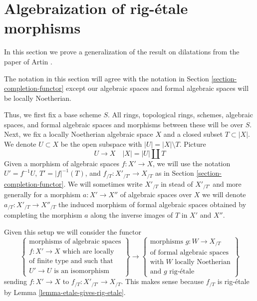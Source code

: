 













\section{Algebraization of rig-\'etale morphisms}
\label{section-algebraization}

\noindent
In this section we prove a generalization of the result on dilatations
from the paper of Artin \cite{ArtinII}.

\medskip\noindent
The notation in this section will agree with the notation in
Section \ref{section-completion-functor} except our algebraic
spaces and formal algebraic spaces will be locally Noetherian.

\medskip\noindent
Thus, we first fix a base scheme $S$. All rings, topological rings,
schemes, algebraic spaces, and formal algebraic spaces and
morphisms between these will be over $S$. Next, we fix a
locally Noetherian algebraic space $X$ and a closed subset $T \subset |X|$.
We denote $U \subset X$ be the open subspace with $|U| = |X| \setminus T$.
Picture
$$
U \to X \quad |X| = |U| \amalg T
$$
Given a morphism of algebraic spaces $f : X' \to X$, we will use the notation
$U' = f^{-1}U$, $T' = |f|^{-1}(T)$, and $f_{/T} : X'_{/T'} \to X_{/T}$ as in
Section \ref{section-completion-functor}. We will sometimes write
$X'_{/T}$ in stead of $X'_{/T'}$ and more generally for a morphism
$a : X' \to X''$ of algebraic spaces over $X$ we will denote
$a_{/T} : X'_{/T} \to X''_{/T}$ the induced morphism of formal
algebraic spaces obtained by completing the morphism $a$ along
the inverse images of $T$ in $X'$ and $X''$.

\medskip\noindent
Given this setup we will consider the functor
\begin{equation}
\label{equation-completion-functor}
\left\{
\begin{matrix}
\text{morphisms of algebraic spaces}\\
f : X' \to X\text{ which are locally}\\
\text{of finite type and such that}\\
U' \to U\text{ is an isomorphism}
\end{matrix}
\right\}
\longrightarrow
\left\{
\begin{matrix}
\text{morphisms }g : W \to X_{/T}\\
\text{of formal algebraic spaces}\\
\text{with }W\text{ locally Noetherian}\\
\text{and }g\text{ rig-\'etale}
\end{matrix}
\right\}
\end{equation}
sending $f : X' \to X$ to $f_{/T} : X'_{/T'} \to X_{/T}$.
This makes sense because $f_{/T}$ is rig-\'etale by
Lemma \ref{lemma-etale-gives-rig-etale}.

